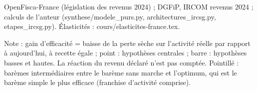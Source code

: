 OpenFisca-France (législation des revenus 2024) ; DGFiP, IRCOM revenus 2024 ; calculs de l'auteur (synthese/modele\_purs.py, architectures\_ircsg.py, etapes\_ircsg.py). Élasticités : cours/elasticites-france.tex.\par Note : gain d'efficacité = baisse de la perte sèche sur l'activité réelle par rapport à aujourd'hui, à recette égale ; point : hypothèses centrales ; barre : hypothèses basses et hautes. La réaction du revenu déclaré n'est pas comptée. Pointillé : barèmes intermédiaires entre le barème sans marche et l'optimum, qui est le barème simple le plus efficace (franchise d'activité comprise).

